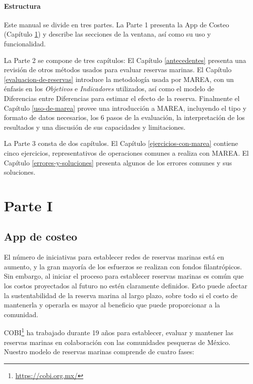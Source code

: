 \documentclass[]{krantz}
\renewcommand{\href}[2]{#2\footnote{\url{#1}}}
\begin{document}
\hypertarget{estructura}{%
\subsection{Estructura}\label{estructura}}

Este manual se divide en tres partes. La Parte 1 presenta la App de
Costeo (Capítulo \ref{app-de-costeo}) y describe las secciones de la
ventana, así como su uso y funcionalidad.

La Parte 2 se compone de tres capítulos: El Capítulo \ref{antecedentes}
presenta una revisión de otros métodos usados para evaluar reservas
marinas. El Capítulo \ref{evaluacion-de-reservas} introduce la
metodología usada por MAREA, con un énfasis en los \emph{Objetivos} e
\emph{Indicadores} utilizados, así como el modelo de Diferencias entre
Diferencias para estimar el efecto de la reserva. Finalmente el Capítulo
\ref{uso-de-marea} provee una introducción a MAREA, incluyendo el tipo y
formato de datos necesarios, los 6 pasos de la evaluación, la
interpretación de los resultados y una discusión de sus capacidades y
limitaciones.

La Parte 3 consta de dos capítulos. El Capítulo
\ref{ejercicios-con-marea} contiene cinco ejercicios, representativos de
operaciones comunes a realiza con MAREA. El Capítulo
\ref{errores-y-soluciones} presenta algunos de los errores comunes y sus
soluciones.

\mainmatter

\hypertarget{part-parte-i}{%
\part{Parte I}\label{part-parte-i}}

\hypertarget{app-de-costeo}{%
\chapter{App de costeo}\label{app-de-costeo}}

El número de iniciativas para establecer redes de reservas marinas está
en aumento, y la gran mayoría de los esfuerzos se realizan con fondos
filantrópicos. Sin embargo, al iniciar el proceso para establecer
reservas marinas es común que los costos proyectados al futuro no estén
claramente definidos. Esto puede afectar la sustentabilidad de la
reserva marina al largo plazo, sobre todo si el costo de mantenerla y
operarla es mayor al beneficio que puede proporcionar a la comunidad.

\href{https://cobi.org.mx/}{COBI} ha trabajado durante 19 años para
establecer, evaluar y mantener las reservas marinas en colaboración con
las comunidades pesqueras de México. Nuestro modelo de reservas marinas
comprende de cuatro fases:
\end{document}
